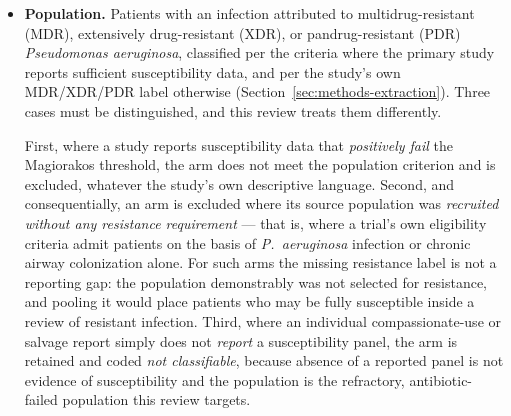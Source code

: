 \begin{itemize}
\item \textbf{Population.} Patients with an infection attributed to multidrug-resistant (MDR), extensively drug-resistant (XDR), or pandrug-resistant (PDR) \textit{Pseudomonas aeruginosa}, classified per the \textcite{Magiorakos2012_mdrxdr} criteria where the primary study reports sufficient susceptibility data, and per the study's own MDR/XDR/PDR label otherwise (Section~\ref{sec:methods-extraction}). Three cases must be distinguished, and this review treats them differently.

First, where a study reports susceptibility data that \emph{positively fail} the Magiorakos threshold, the arm does not meet the population criterion and is excluded, whatever the study's own descriptive language. Second, and consequentially, an arm is excluded where its source population was \emph{recruited without any resistance requirement} --- that is, where a trial's own eligibility criteria admit patients on the basis of \textit{P.\ aeruginosa} infection or chronic airway colonization alone. For such arms the missing resistance label is not a reporting gap: the population demonstrably was not selected for resistance, and pooling it would place patients who may be fully susceptible inside a review of resistant infection. Third, where an individual compassionate-use or salvage report simply does not \emph{report} a susceptibility panel, the arm is retained and coded \emph{not classifiable}, because absence of a reported panel is not evidence of susceptibility and the population is the refractory, antibiotic-failed population this review targets.


\end{itemize}
